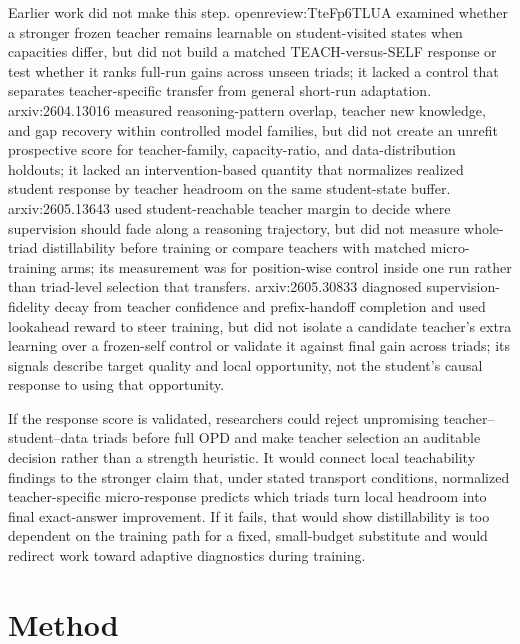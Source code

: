 \documentclass[10pt,a4paper]{article}
\begin{document}
Earlier work did not make this step. openreview:TteFp6TLUA examined whether a stronger frozen teacher remains learnable on student-visited states when capacities differ, but did not build a matched TEACH-versus-SELF response or test whether it ranks full-run gains across unseen triads;\allowbreak{} it lacked a control that separates teacher-specific transfer from general short-run adaptation. arxiv:2604.13016 measured reasoning-pattern overlap, teacher new knowledge, and gap recovery within controlled model families, but did not create an unrefit prospective score for teacher-family, capacity-ratio, and data-distribution holdouts;\allowbreak{} it lacked an intervention-based quantity that normalizes realized student response by teacher headroom on the same student-state buffer. arxiv:2605.13643 used student-reachable teacher margin to decide where supervision should fade along a reasoning trajectory, but did not measure whole-triad distillability before training or compare teachers with matched micro-training arms;\allowbreak{} its measurement was for position-wise control inside one run rather than triad-level selection that transfers. arxiv:2605.30833 diagnosed supervision-fidelity decay from teacher confidence and prefix-handoff completion and used lookahead reward to steer training, but did not isolate a candidate teacher's extra learning over a frozen-self control or validate it against final gain across triads;\allowbreak{} its signals describe target quality and local opportunity, not the student's causal response to using that opportunity.

If the response score is validated, researchers could reject unpromising teacher--student--data triads before full OPD and make teacher selection an auditable decision rather than a strength heuristic. It would connect local teachability findings to the stronger claim that, under stated transport conditions, normalized teacher-specific micro-response predicts which triads turn local headroom into final exact-answer improvement. If it fails, that would show distillability is too dependent on the training path for a fixed, small-budget substitute and would redirect work toward adaptive diagnostics during training.
\section*{Method}
\end{document}
